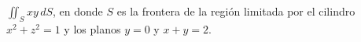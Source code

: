 \item $\iint_S xy \, dS$, en donde $S$ es la frontera de la región limitada por el cilindro $x^2 + z^2 = 1$ y los planos $y = 0$ y $x + y = 2$.
